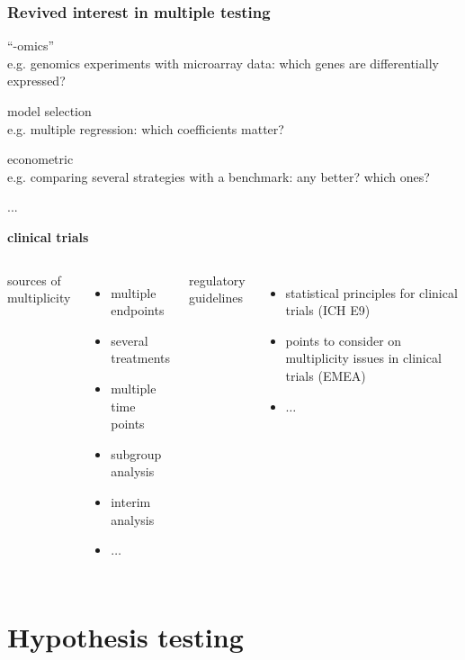 \documentclass[xcolor={pdftex,dvipsnames,table}]{beamer}
\begin{document}
\begin{frame}
\frametitle{Revived interest in multiple testing}


\textcolor{cambridgedarkblue}{\large{``-omics''}}   \\
\scriptsize{e.g. genomics experiments with microarray data: which genes are differentially expressed?}
\smallskip
\smallskip

\textcolor{cambridgedarkblue}{\large{model selection}}\\
\scriptsize{e.g. multiple regression: which coefficients matter?}
\smallskip
\smallskip

\textcolor{cambridgedarkblue}{\large{econometric}}\\
\scriptsize{e.g. comparing several strategies with a benchmark: any better? which ones?}
\smallskip
\smallskip

\textcolor{cambridgedarkblue}{\large{...}}
\smallskip
\smallskip


\begin{block}{\Large \textbf{clinical trials}}
\begin{columns}[t]
\normalsize{
\textcolor{cambridgedarkorange}{sources of multiplicity}
\begin{itemize}
\item multiple endpoints
\item several treatments
\item multiple time points
\item subgroup analysis
\item interim analysis
\item $\ldots$
\end{itemize}}

\normalsize{
\textcolor{cambridgedarkorange}{regulatory guidelines}
\begin{itemize}
\item statistical principles for clinical trials (ICH E9)
\item points
to consider on multiplicity issues in clinical
trials (EMEA)
\item $\ldots$
\end{itemize}}
\end{columns}
\end{block}



\end{frame}

\section{Hypothesis testing}
\end{document}

